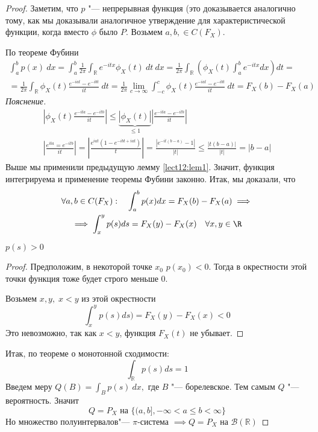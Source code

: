 \documentclass[a4paper,reqno]{amsart}
\begin{document}
\begin{proof}
    Заметим, что $p$ "--- непрерывная функция (это доказывается аналогично тому, как мы доказывали аналогичное утверждение для характеристической функции, когда вместо $\phi$ было $P$. Возьмем $a, b, \in C(F_X)$. 

    По теореме Фубини
    \begin{gather*}
        \int_a^b p(x)\: dx = \int_a^b \frac{1}{2\pi}\int_\mathbb{R} e^{-itx}\phi_X(t)\:dt\: dx = \frac{1}{2\pi}\int_\mathbb{R}\left(\phi_X(t) \int_a^b e^{-itx} dx\right)dt = \\
        =\frac{1}{2\pi} \int_\mathbb{R} \phi_X(t) \frac{e^{-iat} - e^{-ibt}}{it}\:dt = \frac{1}{2\pi}\lim_{c\to \infty} \int_{-c}^c \phi_X(t) \frac{e^{-iat} - e^{-ibt}}{it}\:dt = F_X(b) - F_X(a)
    \end{gather*}
    \emph{Пояснение.} 
\begin{gather*}
    \left|\phi_X(t) \frac{e^{-ita} - e^{-itb}}{it} \right| \leqslant \underbrace{|\phi_X(t)|}_{\leqslant 1} \left|\frac{e^{-ita} - e^{-itb}}{it}\right|\\
    \left|\frac{e^{ita} = e^{-itb}}{it}\right| = \left|\frac{e^{iat} (1 - e^{-ibt + iat})}{t}\right| = \frac{\left|e^{-it(b-a)} - 1\right|}{|t|}  \leqslant \frac{|t(b-a)|}{|t|} = |b-a|
\end{gather*}
Выше мы применили предыдущую лемму \ref{lect12:lem1}. Значит, функция интегрируема и применение теоремы Фубини законно.
Итак, мы доказали, что
\begin{multline}\forall a, b \in C(F_X): \quad \int_a^b p(x) dx = F_X(b) - F_X(a) \implies \\\implies\int_x^y p(s) ds = F_X(y) - F_X(x)\quad \forall x, y \in \R
\end{multline}

\begin{nb}
     $p(s) > 0$
     \begin{proof}
         Предположим, в некоторой точке $x_0$ $p(x_0) < 0$. Тогда в окрестности этой точки функция тоже будет строго меньше 0.

         Возьмем $x, y, \; x < y$ из этой окрестности
         $$\int_x^y p(s) ds) = F_X(y) -F_X(x) < 0$$
         Это невозможно, так как $x < y$, функция $F_X(t)$ не убывает.
     \end{proof}
 \end{nb}
Итак, по теореме о монотонной сходимости:
$$\int_\mathbb{R} p(s) ds = 1$$
Введем меру $Q(B)=\int_Bp(s) \:dx,$ где $B$ "--- борелевское. Тем самым $Q$ "--- вероятность. Значит
$$Q = P_X \mbox{ на } \{(a, b], -\infty < a \leqslant b < \infty\} $$
Но множество полуинтервалов"--- $\pi$-система $\implies Q = P_X$ на $\mathcal{B}(\mathbb{R})$
\end{proof}
\end{document}
